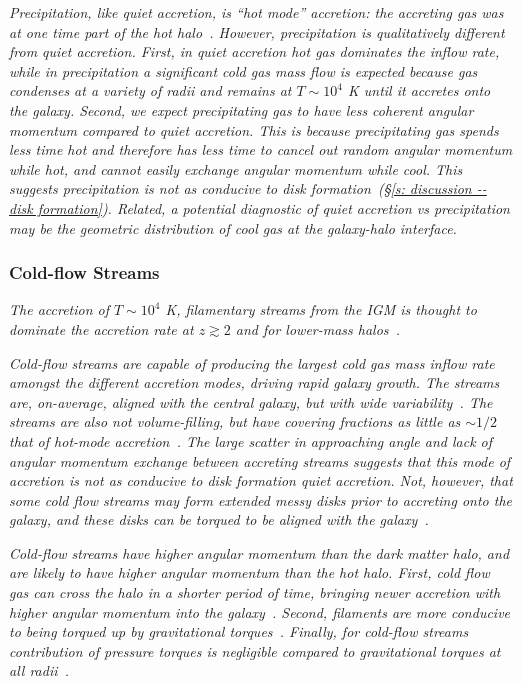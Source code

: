\documentclass[fleqn,usenatbib]{mnras}
\begin{document}
\textit{
Precipitation, like quiet accretion, is ``hot mode'' accretion: the accreting gas was at one time part of the hot halo~\citep[e.g.][]{Nelson2013}.
However, precipitation is qualitatively different from quiet accretion.
First, in quiet accretion hot gas dominates the inflow rate, while in precipitation a significant cold gas mass flow is expected because gas condenses at a variety of radii and remains at $T\sim 10^4$ K until it accretes onto the galaxy.
Second, we expect precipitating gas to have less coherent angular momentum compared to quiet accretion.
This is because precipitating gas spends less time hot and therefore has less time to cancel out random angular momentum while hot, and cannot easily exchange angular momentum while cool.
This suggests precipitation is not as conducive to disk formation~(\S\ref{s: discussion -- disk formation}).
Related, a potential diagnostic of quiet accretion vs precipitation may be the geometric distribution of cool gas at the galaxy-halo interface.
}

\subsubsection{Cold-flow Streams}
\label{s: modes -- cold}

\textit{
The accretion of $T\sim 10^4$ K, filamentary streams from the IGM is thought to dominate the accretion rate at $z\gtrsim 2$ and for lower-mass halos~\citep[e.g.][]{Keres2005, Keres2009, Dekel2006, Oser2010, VanDeVoort2011a}.
}

\textit{
Cold-flow streams are capable of producing the largest cold gas mass inflow rate amongst the different accretion modes, driving rapid galaxy growth.
The streams are, on-average, aligned with the central galaxy, but with wide variability~\citep[e.g.][]{Stewart2011a, danovich2012, Stewart2013, Stewart2017}.
The streams are also not volume-filling, but have covering fractions as little as $\sim 1/2$ that of hot-mode accretion~\citep[e.g.][]{Wright2021}.
The large scatter in approaching angle and lack of angular momentum exchange between accreting streams suggests that this mode of accretion is not as conducive to disk formation quiet accretion.
Not, however, that some cold flow streams may form extended messy disks prior to accreting onto the galaxy, and these disks can be torqued to be aligned with the galaxy~\cite{danovich2012, Danovich2015}.
}

\textit{
Cold-flow streams have higher angular momentum than the dark matter halo, and are likely to have higher angular momentum than the hot halo.
First, cold flow gas can cross the halo in a shorter period of time, bringing newer accretion with higher angular momentum into the galaxy~\citep[e.g.][]{Stewart2013}.
Second, filaments are more conducive to being torqued up by gravitational torques~\citep[e.g.][]{Stewart2013, Danovich2015}.
Finally, for cold-flow streams contribution of pressure torques is negligible compared to gravitational torques at all radii~\citep[e.g.][]{Danovich2015}.
}
\end{document}
